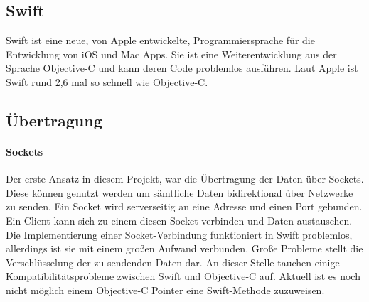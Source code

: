 \subsection{Swift}
Swift ist eine neue, von Apple entwickelte, Programmiersprache für die Entwicklung von iOS und Mac Apps. Sie ist eine Weiterentwicklung aus der Sprache Objective-C und kann deren Code problemlos ausführen. Laut Apple ist Swift rund 2,6 mal so schnell wie Objective-C.

\subsection{Übertragung}

\paragraph{Sockets}
Der erste Ansatz in diesem Projekt, war die Übertragung der Daten über Sockets. Diese können genutzt werden um sämtliche Daten bidirektional über Netzwerke zu senden. Ein Socket wird serverseitig an eine Adresse und einen Port gebunden. Ein Client kann sich zu einem diesen Socket verbinden und Daten austauschen. \\
Die Implementierung einer Socket-Verbindung funktioniert in Swift problemlos, allerdings ist sie mit einem großen Aufwand verbunden. Große Probleme stellt die Verschlüsselung der zu sendenden Daten dar. An dieser Stelle tauchen einige Kompatibilitätsprobleme zwischen Swift und Objective-C auf. Aktuell ist es noch nicht möglich einem Objective-C Pointer eine Swift-Methode zuzuweisen\cite{swiftproblem}.

